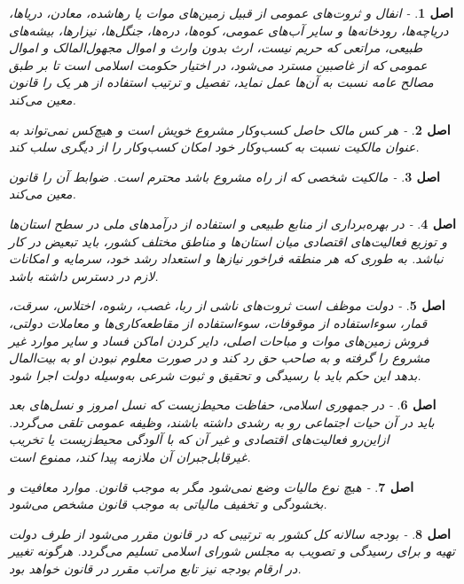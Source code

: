 \documentclass[12pt]{article}
\newtheorem{asl}{اصل}
\begin{document}
\begin{asl}- 
انفال و ثروت‌های عمومی از قبیل زمین‌های موات یا رهاشده‌، معادن‌، دریاها، دریاچه‌ها، رودخانه‌ها و سایر آب‌های عمومی، کوه‌ها، دره‌ها، جنگل‌ها، نیزارها، بیشه‌های طبیعی‌، مراتعی که حریم نیست‌، ارث بدون وارث و اموال مجهول‌المالک و اموال عمومی که از غاصبین مسترد می‌شود، در اختیار حکومت اسلامی است تا بر طبق مصالح عامه نسبت به آن‌ها عمل نماید، تفصیل و ترتیب استفاده از هر یک را قانون معین می‌کند.
\end{asl}

\begin{asl}- 
هر کس مالک حاصل کسب‌وکار مشروع خویش است و هیچ‌کس نمی‌تواند به عنوان مالکیت نسبت به کسب‌وکار خود امکان کسب‌وکار را از دیگری سلب کند.
\end{asl}

\begin{asl}- 
مالکیت شخصی که از راه مشروع باشد محترم است. ضوابط آن را قانون معین می‌کند.
\end{asl}

\begin{asl}- 
در بهره‌برداری از منابع طبیعی و استفاده از درآمدهای ملی در سطح استان‌ها و توزیع فعالیت‌های اقتصادی میان استان‌ها و مناطق مختلف کشور، باید تبعیض در کار نباشد. به طوری که هر منطقه فراخور نیازها و استعداد رشد خود، سرمایه و امکانات لازم در دسترس داشته باشد.
\end{asl}

\begin{asl}- 
دولت موظف است ثروت‌های ناشی از ربا، غصب‌، رشوه‌، اختلاس‌، سرقت‌، قمار، سوءاستفاده از موقوفات‌، سوءاستفاده از مقاطعه‌کاری‌ها و معاملات دولتی‌، فروش زمین‌های موات و مباحات اصلی‌، دایر کردن اماکن فساد و سایر موارد غیر مشروع را گرفته و به صاحب حق رد کند و در صورت ‌معلوم نبودن او به بیت‌المال بدهد این حکم باید با رسیدگی و تحقیق و ثبوت شرعی به‌وسیله دولت اجرا شود.
\end{asl}

\begin{asl}- 
در جمهوری اسلامی‌، حفاظت محیط‌زیست که نسل امروز و نسل‌های بعد باید در آن حیات اجتماعی رو به رشدی داشته باشند، وظیفه عمومی تلقی می‌گردد. ازاین‌رو فعالیت‌های اقتصادی و غیر آن که با آلودگی محیط‌زیست یا تخریب غیرقابل‌جبران آن‌ ملازمه پیدا کند، ممنوع است‌.
\end{asl}

\begin{asl}- 
هیچ نوع مالیات وضع نمی‌شود مگر به موجب قانون. موارد معافیت و بخشودگی و تخفیف مالیاتی به موجب قانون مشخص می‌شود.
\end{asl}

\begin{asl}- 
بودجه سالانه کل کشور به ترتیبی که در قانون مقرر می‌شود از طرف دولت تهیه و برای رسیدگی و تصویب به مجلس شورای اسلامی تسلیم می‌گردد. هرگونه تغییر در ارقام بودجه نیز تابع مراتب مقرر در قانون خواهد بود.
\end{asl}
\end{document}
